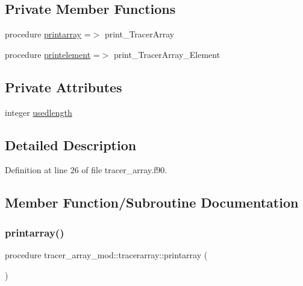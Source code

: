 \subsection*{Private Member Functions}
\begin{DoxyCompactItemize}
\item 
procedure \mbox{\hyperlink{structtracer__array__mod_1_1tracerarray_a135a59d74ec030814a19278694d25d0a}{printarray}} =$>$ print\+\_\+\+Tracer\+Array
\item 
procedure \mbox{\hyperlink{structtracer__array__mod_1_1tracerarray_a253185a06f76355710fcdd52d9a525f6}{printelement}} =$>$ print\+\_\+\+Tracer\+Array\+\_\+\+Element
\end{DoxyCompactItemize}
\subsection*{Private Attributes}
\begin{DoxyCompactItemize}
\item 
integer \mbox{\hyperlink{structtracer__array__mod_1_1tracerarray_aa2315d68128c5a0695d2233a48680328}{usedlength}}
\end{DoxyCompactItemize}


\subsection{Detailed Description}


Definition at line 26 of file tracer\+\_\+array.\+f90.



\subsection{Member Function/\+Subroutine Documentation}
\mbox{\label{structtracer__array__mod_1_1tracerarray_a135a59d74ec030814a19278694d25d0a}} 
\subsubsection{\texorpdfstring{printarray()}{printarray()}}
{\footnotesize\ttfamily procedure tracer\+\_\+array\+\_\+mod\+::tracerarray\+::printarray (\begin{DoxyParamCaption}{ }\end{DoxyParamCaption})\hspace{0.3cm}{\ttfamily [private]}}



